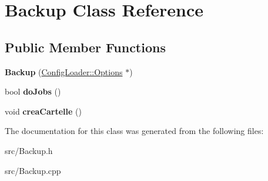 \hypertarget{class_backup}{
\section{Backup Class Reference}
\label{class_backup}
}
\subsection*{Public Member Functions}
\begin{DoxyCompactItemize}
\item 
\hypertarget{class_backup_a879421a97da307481d7ae4987b8e6cdd}{
{\bfseries Backup} (\hyperlink{class_config_loader_1_1_options}{ConfigLoader::Options} $\ast$)}
\label{class_backup_a879421a97da307481d7ae4987b8e6cdd}

\item 
\hypertarget{class_backup_a58a29b295ce1527071eb0f7e2cbc98f3}{
bool {\bfseries doJobs} ()}
\label{class_backup_a58a29b295ce1527071eb0f7e2cbc98f3}

\item 
\hypertarget{class_backup_a6978b60d3e7c695f4cb673a092133f25}{
void {\bfseries creaCartelle} ()}
\label{class_backup_a6978b60d3e7c695f4cb673a092133f25}

\end{DoxyCompactItemize}


The documentation for this class was generated from the following files:\begin{DoxyCompactItemize}
\item 
src/Backup.h\item 
src/Backup.cpp\end{DoxyCompactItemize}
